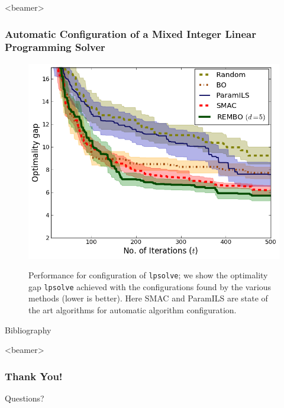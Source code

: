 \documentclass[grey]{beamer}
\begin{document}
 \begin{frame}<beamer>
 \frametitle{Automatic Configuration of a Mixed Integer
Linear Programming Solver}
  \begin{figure}[h!]
   \begin{center}
     \includegraphics[scale=0.35]{../paper/figures/lpsolve.png}\\
     \caption{Performance for configuration of \texttt{lpsolve}; we show the optimality gap \texttt{lpsolve} achieved with the configurations found by the various methods (lower is better). Here SMAC and ParamILS are state of the art algorithms for automatic algorithm configuration.}
   \label{fig:lpsolve}
   \end{center}
   \vspace*{-3mm}
  \end{figure}
 \end{frame}

 \begin{frame}{Bibliography}
  \tiny
  
  
 \end{frame}
 
 \begin{frame}<beamer>
 \frametitle{Thank You!}
  \begin{center}
  \huge
    Questions?
  \end{center}
 \end{frame}
 
 

 
\end{document}
